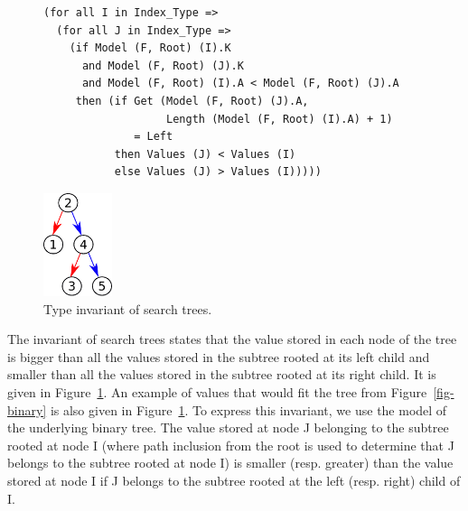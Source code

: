 \documentclass{llncs}
\begin{document}

\begin{figure}[ht]
\hspace{-2mm}
\begin{minipage}[c]{.78\linewidth}
\begin{small}
\begin{lstlisting}
(for all I in Index_Type =>
  (for all J in Index_Type =>
    (if Model (F, Root) (I).K
      and Model (F, Root) (J).K
      and Model (F, Root) (I).A < Model (F, Root) (J).A
     then (if Get (Model (F, Root) (J).A,
                   Length (Model (F, Root) (I).A) + 1)
              = Left
           then Values (J) < Values (I)
           else Values (J) > Values (I)))))
\end{lstlisting}
\end{small}
\end{minipage}
\begin{minipage}[c]{.22\linewidth}
\begin{center}
\includegraphics[width=2cm]{search.pdf}
\end{center}
\end{minipage}
\caption{\label{fig-search} Type invariant of search trees.}
\end{figure}

The invariant of search trees states that the value stored in each node of the
tree is bigger than all the values stored in the subtree rooted at its left
child and smaller than all the values stored in the subtree rooted at its right
child. It is given in Figure~\ref{fig-search}. An example of values that would
fit the tree from Figure~\ref{fig-binary} is also given in
Figure~\ref{fig-search}. To express this invariant, we use the model of the
underlying binary tree. The value stored at node J belonging to the subtree
rooted at node I (where path inclusion from the root is used to determine that
J belongs to the subtree rooted at node I) is smaller (resp. greater) than the
value stored at node I if J belongs to the subtree rooted at the left
(resp. right) child of I.
\end{document}
